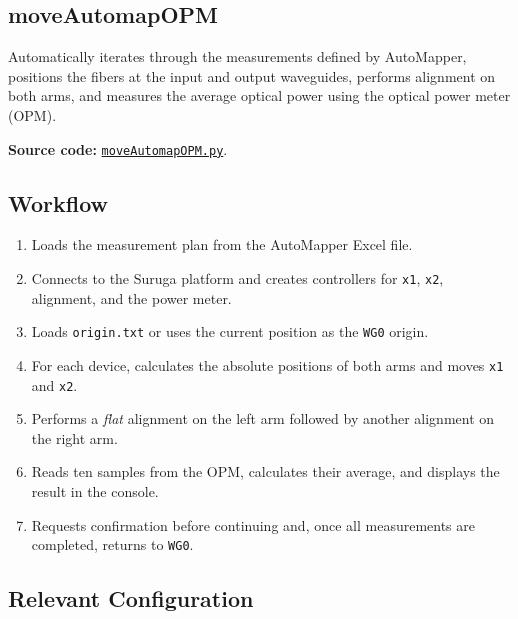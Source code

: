 \subsection{moveAutomapOPM}

Automatically iterates through the measurements defined by AutoMapper, positions the fibers at the input and output waveguides, performs alignment on both arms, and measures the average optical power using the optical power meter (OPM).

\textbf{Source code:}
\href{https://github.com/niospinamev2/SurugaSeikiHex/blob/main/rutinas/moveAutomapOPM.py}
{\texttt{moveAutomapOPM.py}}.

\subsection{Workflow}

\begin{enumerate}
    \item Loads the measurement plan from the AutoMapper Excel file.

    \item Connects to the Suruga platform and creates controllers for \texttt{x1}, \texttt{x2}, alignment, and the power meter.

    \item Loads \texttt{origin.txt} or uses the current position as the \texttt{WG0} origin.

    \item For each device, calculates the absolute positions of both arms and moves \texttt{x1} and \texttt{x2}.

    \item Performs a \textit{flat} alignment on the left arm followed by another alignment on the right arm.

    \item Reads ten samples from the OPM, calculates their average, and displays the result in the console.

    \item Requests confirmation before continuing and, once all measurements are completed, returns to \texttt{WG0}.
\end{enumerate}

\subsection{Relevant Configuration}

